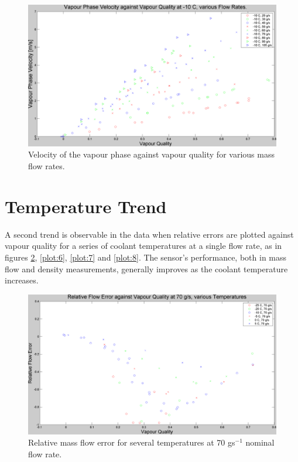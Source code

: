 \documentclass{report}
\begin{document}
\begin{figure}
\includegraphics[width=\textwidth]{plots/fig12}
\caption{Velocity of the vapour phase against vapour quality for various mass flow rates.}
\label{gasVelocity}
\end{figure}

\FloatBarrier
\section{Temperature Trend}
A second trend is observable in the data when relative errors are plotted against vapour quality for a series of coolant temperatures at a single flow rate, as in figures \ref{plot:5}, \ref{plot:6}, \ref{plot:7} and \ref{plot:8}. The sensor's performance, both in mass flow and density measurements, generally improves as the coolant temperature increases.
\FloatBarrier
\begin{figure}
\includegraphics[width=\textwidth]{plots/fig5}
\caption{Relative mass flow error for several temperatures at 70 gs$^{-1}$ nominal flow rate.}
\label{plot:5}
\end{figure}
\end{document}
